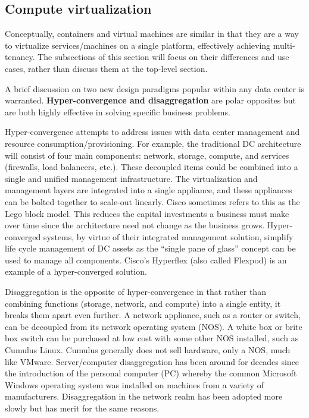 \subsection{Compute virtualization}
Conceptually, containers and virtual machines are similar in that they are a
way to virtualize services/machines on a single platform, effectively
achieving multi-tenancy. The subsections of this section will focus on their
differences and use cases, rather than discuss them at the top-level
section.

A brief discussion on two new design paradigms popular within any data center
is warranted. \textbf{Hyper-convergence and disaggregation} are polar
opposites but are both highly effective in solving specific business problems.

Hyper-convergence attempts to address issues with data center management and
resource consumption/provisioning. For example, the traditional DC
architecture will consist of four main components: network, storage, compute,
and services (firewalls, load balancers, etc.). These decoupled items could be
combined into a single and unified management infrastructure. The
virtualization and management layers are integrated into a single appliance,
and these appliances can be bolted together to scale-out linearly. Cisco
sometimes refers to this as the Lego block model. This reduces the capital
investments a business must make over time since the architecture need not
change as the business grows. Hyper-converged systems, by virtue of their
integrated management solution, simplify life cycle management of DC assets as
the ``single pane of glass'' concept can be used to manage all components.
Cisco's Hyperflex (also called Flexpod) is an example of a hyper-converged
solution.

Disaggregation is the opposite of hyper-convergence in that rather than
combining functions (storage, network, and compute) into a single entity, it
breaks them apart even further. A network appliance, such as a router or
switch, can be decoupled from its network operating system (NOS). A white box
or brite box switch can be purchased at low cost with some other NOS
installed, such as Cumulus Linux. Cumulus generally does not sell hardware,
only a NOS, much like VMware. Server/computer disaggregation has been around
for decades since the introduction of the personal computer (PC) whereby the
common Microsoft Windows operating system was installed on machines from a
variety of manufacturers. Disaggregation in the network realm has been adopted
more slowly but has merit for the same reasons.
